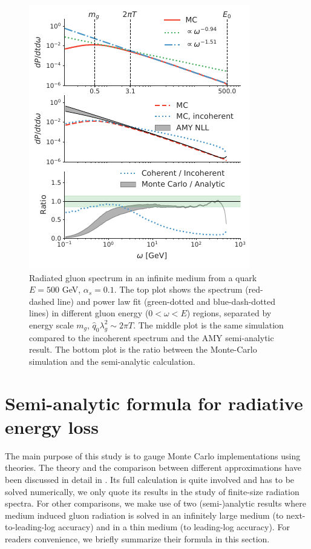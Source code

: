 \documentclass[aps, prc, reprint, amsmath, groupedaddress, nofootinbib]{revtex4-1}
\begin{document}
\begin{figure}
\includegraphics[width=\columnwidth]{spectrum.pdf}
\caption{Radiated gluon spectrum in an infinite medium from a quark $E=500$ GeV, $\alpha_s = 0.1$. The top plot shows the spectrum (red-dashed line) and power law fit (green-dotted and blue-dash-dotted lines) in different gluon energy ($0<\omega < E$) regions, separated by energy scale $m_g$, $\hat{q}_0\lambda_g^2 \sim 2\pi T$. The middle plot is the same simulation compared to the incoherent spectrum and the AMY semi-analytic result. The bottom plot is the ratio between the Monte-Carlo simulation and the semi-analytic calculation.}
\label{fig:spectrum}
\end{figure}
\section{Semi-analytic formula for radiative energy loss}\label{section:Theo}
The main purpose of this study is to gauge Monte Carlo implementations using theories.
The theory and the comparison between different approximations have been discussed in detail in \cite{CaronHuot:2008uh}.
Its full calculation is quite involved and has to be solved numerically, we only quote its results in the study of finite-size radiation spectra.
For other comparisons, we make use of two (semi-)analytic results where medium induced gluon radiation is solved in an infinitely large medium (to next-to-leading-log accuracy) and in a thin medium (to leading-log accuracy).
For readers convenience, we briefly summarize their formula in this section.
\end{document}
